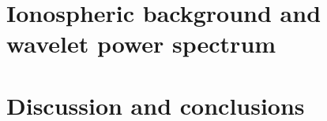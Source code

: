 \documentclass[times,twocolumn,final,authoryear]{elsarticle}
\begin{document}
\section{Ionospheric background and wavelet power spectrum}
\label{sec:vTEC-maps}
     
     
     
     
     
\section{Discussion and conclusions}
\label{sec:discussion}



   
\end{document}
